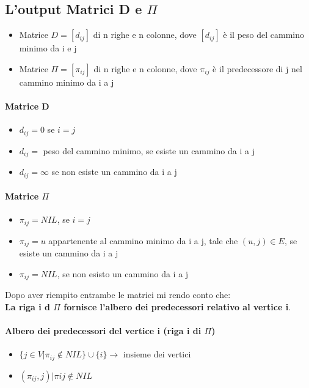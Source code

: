 \subsection{L'output Matrici D e $\Pi$}
\begin{itemize}
    \item Matrice $D = [d_{ij}]$ di n righe e n colonne, dove $ [d_{ij}]$ è il peso del
    cammino minimo da i e j
    \item Matrice $\Pi = [\pi_{ij}]$ di n righe e n colonne, dove $\pi_{ij}$ è il predecessore di j
    nel cammino minimo da i a j
\end{itemize}
\paragraph*{Matrice D}
\begin{itemize}
    \item $d_{ij} = 0$ se $i = j$
    \item $d_{ij} = $ peso del cammino minimo, se esiste un cammino da i a j
    \item $d_{ij} = \infty$ se non esiste un cammino da i a j
\end{itemize}
\paragraph*{Matrice $\Pi$}
\begin{itemize}
    \item $\pi_{ij} = NIL$, se $i = j$
    \item $\pi_{ij} = u$ appartenente al cammino minimo da i a j, tale che $(u,j) \in E$, se
    esiste un cammino da i a j
    \item $\pi_{ij} = NIL$, se non esisto un cammino da i a j
\end{itemize}
Dopo aver riempito entrambe le matrici mi rendo conto che:\\
\textbf{La riga i d $\Pi$ fornisce l'albero dei predecessori relativo al vertice i}.
\paragraph{Albero dei predecessori del vertice i (riga i di $\Pi$)}
\begin{itemize}
    \item $\{ j \in V | \pi_{ij} \notin NIL\} \cup \{i\} \rightarrow$ insieme dei vertici
    \item ${(\pi_{ij}, j) | \pi{ij} \notin NIL}$
\end{itemize}
